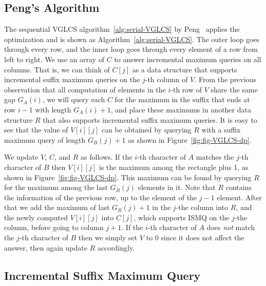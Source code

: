 
\subsection{Peng's Algorithm}

The sequential VGLCS algorithm~\ref{alg:serial-VGLCS} by
Peng~\cite{Peng2011TheLC} applies the optimization and is shown as
Algorithm~\ref{alg:serial-VGLCS}.  The outer loop goes through every
row, and the inner loop goes through every element of a row from left to
right.  We use an array of $C$ to answer incremental maximum queries on
all columns.  That is, we can think of $C[j]$ as a data structure that
supports incremental suffix maximum queries on the $j$-th column of $V$.
From the previous observation that all computation of elements in the
$i$-th row of $V$ share the same gap $G_A(i)$, we will query each $C$
for the maximum in the suffix that ends at row $i-1$ with length
$G_A(i)+1$, and place these maximums in another data structure $R$ that
also supports incremental suffix maximum queries.  It is easy to see
that the value of $V[i][j]$ can be obtained by querying $R$ with a
suffix maximum query of length $G_B(j)+1$ as shown in
Figure~\ref{fig:fig-VGLCS-dp}.

We update $V$, $C$, and $R$ as follows.  If the $i$-th character of $A$
matches the $j$-th character of $B$ then $V[i][j]$ is the maximum among
the rectangle plus 1, as shown in Figure~\ref{fig:fig-VGLCS-dp}. This
maximum can be found by querying $R$ for the maximum among the last
$G_B(j)$ elements in it.  Note that $R$ contains the information of the
previous row, up to the element of the $j-1$ element.  After that we add
the maximum of last $G_B(j)+1$ in the $j$-the column into $R$, and the
newly computed $V[i][j]$ into $C[j]$, which supports ISMQ on the $j$-the
column, before going to column $j+1$.  If the $i$-th character of $A$
does {\em not} match the $j$-th character of $B$ then we simply set $V$
to 0 since it does not affect the answer, then again update $R$
accordingly.
 
 


\subsection{Incremental Suffix Maximum Query}

